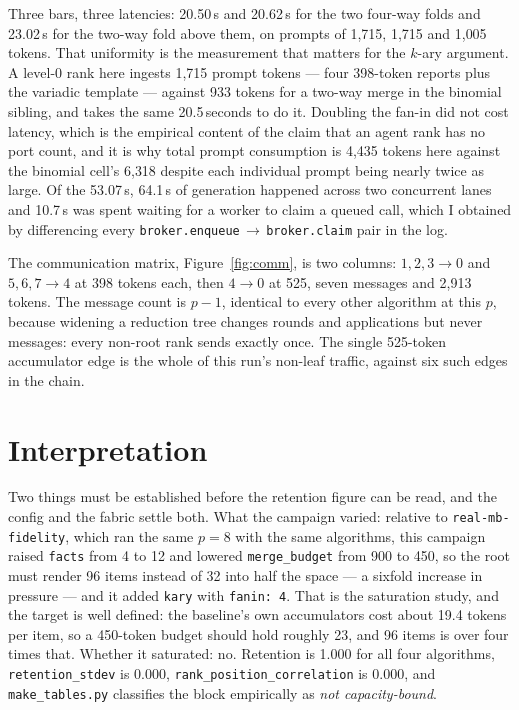 \documentclass[11pt]{article}
\begin{document}
Three bars, three latencies: 20.50\,s and 20.62\,s for the two four-way folds and 23.02\,s
for the two-way fold above them, on prompts of 1{,}715, 1{,}715 and 1{,}005 tokens. That
uniformity is the measurement that matters for the $k$-ary argument. A level-0 rank here
ingests 1{,}715 prompt tokens --- four 398-token reports plus the variadic template ---
against 933 tokens for a two-way merge in the binomial sibling, and takes the same
20.5\,seconds to do it. Doubling the fan-in did not cost latency, which is the empirical
content of the claim that an agent rank has no port count, and it is why total prompt
consumption is 4{,}435 tokens here against the binomial cell's 6{,}318 despite each
individual prompt being nearly twice as large. Of the 53.07\,s, 64.1\,s of generation
happened across two concurrent lanes and 10.7\,s was spent waiting for a worker to claim a
queued call, which I obtained by differencing every
\texttt{broker.enqueue}\,$\to$\,\texttt{broker.claim} pair in the log.

The communication matrix, Figure~\ref{fig:comm}, is two columns: $1,2,3\!\to\!0$ and
$5,6,7\!\to\!4$ at 398 tokens each, then $4\!\to\!0$ at 525, seven messages and 2{,}913
tokens. The message count is $p-1$, identical to every other algorithm at this $p$, because
widening a reduction tree changes rounds and applications but never messages: every
non-root rank sends exactly once. The single 525-token accumulator edge is the whole of
this run's non-leaf traffic, against six such edges in the chain.

\section{Interpretation}

Two things must be established before the retention figure can be read, and the config and
the fabric settle both. What the campaign varied: relative to
\texttt{real-mb-fidelity}, which ran the same $p=8$ with the same algorithms, this campaign
raised \texttt{facts} from 4 to 12 and lowered \texttt{merge\_budget} from 900 to 450, so
the root must render 96 items instead of 32 into half the space --- a sixfold increase in
pressure --- and it added \texttt{kary} with \texttt{fanin: 4}. That is the saturation
study, and the target is well defined: the baseline's own accumulators cost about 19.4
tokens per item, so a 450-token budget should hold roughly 23, and 96 items is over four
times that. Whether it saturated: no. Retention is 1.000 for all four algorithms,
\texttt{retention\_stdev} is 0.000, \texttt{rank\_position\_correlation} is 0.000, and
\texttt{make\_tables.py} classifies the block empirically as \emph{not capacity-bound}.
\end{document}
